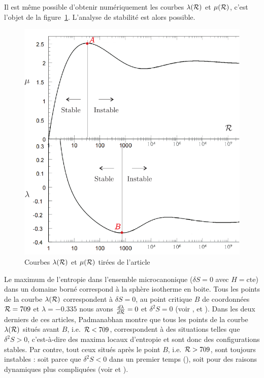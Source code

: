 	Il est même possible d'obtenir numériquement les courbes $\lambda(\mathcal{R})$ et $\mu(\mathcal{R})$, c'est l'objet de la figure~\ref{Cal_stab}. L'analyse de
	stabilité est alors possible. 
	\begin{figure}[h!]
		\centering \includegraphics[scale=1.00]{graphe/calorique_stabilite.pdf}
		\caption{Courbes $\lambda(\mathcal{R})$ et $\mu(\mathcal{R})$ tirées de l'article \cite{2011MNRAS.414.2728Y}}
		\label{Cal_stab}
	\end{figure}
	Le maximum de l'entropie dans l'ensemble microcanonique ($\delta S=0$ avec $H=\mathrm{cte}$) dans un domaine
	borné correspond à la sphère isotherme en boite. Tous les points de la courbe $\lambda(\mathcal{R})$ correspondent à
	$\delta S=0$, au point critique $B$ de coordonnées $\mathcal{R}=709$ et $\lambda=-0.335$ nous avons $\frac{d\lambda}{d\mathcal{R}}=0$ et
	$\delta^2 S=0$ (voir \cite{1968MNRAS.138..495L}, \cite{1989ApJS...71..651P} et \cite{1990PhR...188..285P}). Dans
	les deux derniers de ces articles, Padmanabhan montre que
	tous les points de la courbe $\lambda(\mathcal{R})$ situés avant $B$, i.e. $\mathcal{R} < 709$, correspondent à des situations
	telles que $\delta^2 S>0$, c'est-à-dire des maxima locaux d'entropie et sont donc des configurations
	stables. Par contre, tout ceux situés après le point $B$, i.e. $\mathcal{R} > 709$, sont toujours instables : soit parce
	que $\delta^2 S<0$ dans un premier temps (\cite{1989ApJS...71..651P}), soit pour des raisons dynamiques plus
	compliquées (voir \cite{Katz-Stab} et \cite{1979MNRAS.189..817K}). 
	
